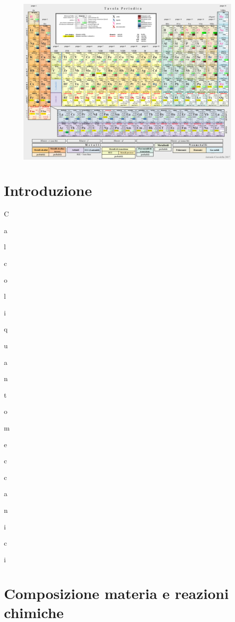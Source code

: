 \documentclass[openany,12pt]{book}%
\newcommand\blankpage{%
    \null
    \thispagestyle{empty}%
    \newpage}
\newcommand{\comment}[1]{}
\begin{document}
\begin{figure}[H]
    \includegraphics[angle=90,origin=c]{immagini/tavola periodica.png}
\end{figure}


\afterpage{\blankpage}

\tableofcontents

\chapter*{Introduzione}

C

a

l

c

o

l

i

q

u

a

n

t

o

m

e

c

c

a

n

i

c

i

\chapter{Composizione materia e reazioni chimiche}
\end{document}
